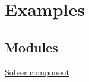 \hypertarget{group__examples}{
\section{Examples}
\label{group__examples}
}
\subsection*{Modules}
\begin{CompactItemize}
\item 
\hyperlink{group__examples__solver}{Solver component}
\end{CompactItemize}
